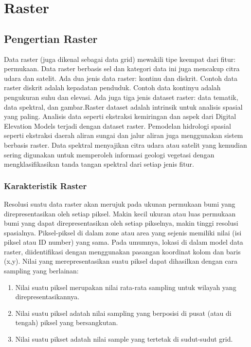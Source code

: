  \section{Raster}
 \subsection{Pengertian Raster}
Data raster (juga dikenal sebagai data grid) mewakili tipe keempat dari fitur: permukaan. 
Data raster berbasis sel dan kategori data ini juga mencakup citra udara dan satelit. 
Ada dua jenis data raster: kontinu dan diskrit. Contoh data raster diskrit adalah kepadatan penduduk. 
Contoh data kontinyu adalah pengukuran suhu dan elevasi. Ada juga tiga jenis dataset raster: data tematik, 
data spektral, dan gambar.Raster dataset adalah intrinsik untuk analisis spasial yang paling. 
Analisis data seperti ekstraksi kemiringan dan aspek dari Digital Elevation Models terjadi dengan dataset raster.
Pemodelan hidrologi spasial seperti ekstraksi daerah aliran sungai dan jalur aliran juga menggunakan sistem berbasis raster.
Data spektral menyajikan citra udara atau satelit yang kemudian sering digunakan 
untuk memperoleh informasi geologi vegetasi dengan mengklasifikasikan tanda tangan spektral dari setiap jenis fitur.

\subsubsection{Karakteristik Raster}
Resolusi suatu data raster akan merujuk pada ukunan permukaan bumi yang direpresentasikan oleh setiap piksel. 
Makin kecil ukuran atau luas permukaan bumi yang dapat direpresentasikan oleh setiap pikselnya, makin tinggi resolusi spasialnya.
Piksel-piksel di dalam zone atau area yang sejenis memiliki nilai (isi piksel atau ID number) yang sama.
Pada umumnya, lokasi di dalam model data raster, diidentifikasi dengan menggunakan pasangan koordinat kolom dan baris (x,y).
Nilai yang merepresentasikan suatu piksel dapat dihasilkan dengan cara sampling yang berlainan:
\begin{enumerate}
\item Nilai suatu piksel merupakan nilai rata-rata sampling untuk wilayah yang direpresentasikannya.
\item Nilai suatu piksel adatah nilai sampling yang berposisi di pusat (atau di tengah) piksel yang bersangkutan.
\item Nilai suatu pikset adatah nilai sample yang tertetak di sudut-sudut grid.
\end{enumerate}

